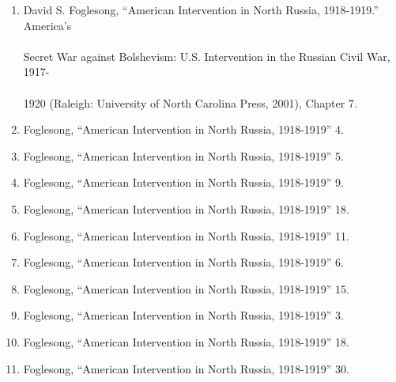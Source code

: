 \begin{enumerate}

  \item David S. Foglesong, ``American Intervention in North Russia, 1918-1919.'' America's
    \vspace{-20pt}
    \paragraph{} Secret War against Bolshevism: U.S. Intervention in the Russian Civil War, 1917-
    \vspace{-20pt}
    \paragraph{} 1920 (Raleigh: University of North Carolina Press, 2001), Chapter 7. 

  \item Foglesong, ``American Intervention in North Russia, 1918-1919'' 4.

  \item Foglesong, ``American Intervention in North Russia, 1918-1919'' 5.

  \item Foglesong, ``American Intervention in North Russia, 1918-1919'' 9.

  \item Foglesong, ``American Intervention in North Russia, 1918-1919'' 18.

  \item Foglesong, ``American Intervention in North Russia, 1918-1919'' 11.

  \item Foglesong, ``American Intervention in North Russia, 1918-1919'' 6.

  \item Foglesong, ``American Intervention in North Russia, 1918-1919'' 15.

  \item Foglesong, ``American Intervention in North Russia, 1918-1919'' 3.

  \item Foglesong, ``American Intervention in North Russia, 1918-1919'' 18.

  \item Foglesong, ``American Intervention in North Russia, 1918-1919'' 30.

\end{enumerate}



